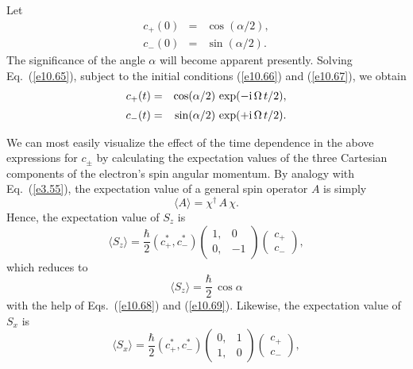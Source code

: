 Let
\begin{eqnarray}
c_+(0) &=& \cos(\alpha/2),\label{e10.66}\\[0.5ex]
c_-(0) &=& \sin(\alpha/2).\label{e10.67}
\end{eqnarray}
The significance of the angle $\alpha$ will become apparent presently.
Solving Eq.~(\ref{e10.65}),  subject to the initial conditions
(\ref{e10.66}) and (\ref{e10.67}), we obtain
\begin{eqnarray}\label{e10.68}
c_+(t) &=& \cos(\alpha/2)\,\exp(-{\rm i}\,\Omega\,t/2),\\[0.5ex]
c_-(t)&=& \sin(\alpha/2)\,\exp(+{\rm i}\,\Omega\,t/2).\label{e10.69}
\end{eqnarray}

We can most easily visualize the effect of the time dependence in the above
expressions for $c_\pm$ by calculating the expectation
values of the three Cartesian components of the electron's spin angular momentum. By analogy
with Eq.~(\ref{e3.55}), the expectation value of a general spin operator
$A$ is simply
\begin{equation}
\langle A \rangle = \chi^\dag\,A\,\chi.
\end{equation}
Hence, the expectation value of $S_z$ is
\begin{equation}
\langle S_z\rangle= \frac{\hbar}{2}\left(c_+^\ast, c_-^\ast\right) \left(\begin{array}{cc}1,&0\\
0,& -1\end{array}\right)\left(\begin{array}{c}c_+\\ c_-\end{array}\right),
\end{equation}
which reduces to
\begin{equation}\label{e10.72}
\langle S_z \rangle = \frac{\hbar}{2}\,\cos\alpha
\end{equation}
with the help of Eqs.~(\ref{e10.68}) and (\ref{e10.69}). Likewise,
the expectation value of $S_x$ is
\begin{equation}
\langle S_x\rangle= \frac{\hbar}{2}\left(c_+^\ast, c_-^\ast\right) \left(\begin{array}{cc}0,&1\\
1,& 0\end{array}\right)\left(\begin{array}{c}c_+\\ c_-\end{array}\right),
\end{equation}
